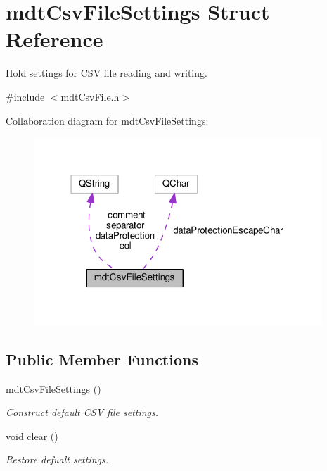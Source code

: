 \hypertarget{structmdt_csv_file_settings}{\section{mdt\-Csv\-File\-Settings Struct Reference}
\label{structmdt_csv_file_settings}
}


Hold settings for C\-S\-V file reading and writing.  




{\ttfamily \#include $<$mdt\-Csv\-File.\-h$>$}



Collaboration diagram for mdt\-Csv\-File\-Settings\-:
\nopagebreak
\begin{figure}[H]
\begin{center}
\leavevmode
\includegraphics[width=307pt]{structmdt_csv_file_settings__coll__graph}
\end{center}
\end{figure}
\subsection*{Public Member Functions}
\begin{DoxyCompactItemize}
\item 
\hyperlink{structmdt_csv_file_settings_a560b5e5349fabaebf2cd9fa33fa8b710}{mdt\-Csv\-File\-Settings} ()
\begin{DoxyCompactList}\small\item\em Construct default C\-S\-V file settings. \end{DoxyCompactList}\item 
void \hyperlink{structmdt_csv_file_settings_ad303ac43045c830d10638361240ffd03}{clear} ()
\begin{DoxyCompactList}\small\item\em Restore defualt settings. \end{DoxyCompactList}\end{DoxyCompactItemize}
